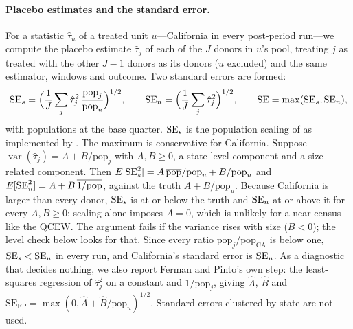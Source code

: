 \paragraph{Placebo estimates and the standard error.} For a statistic $\hat\tau_u$ of a treated
unit $u$---California in every post-period run---we compute the placebo estimate $\hat\tau_j$ of
each of the $J$ donors in $u$'s pool, treating $j$ as treated with the other $J-1$ donors as its
donors ($u$ excluded) and the same estimator, windows and outcome. Two standard errors are formed:
\begin{equation}
\mathrm{SE}_{s} = \Bigl(\frac{1}{J}\sum_j \hat\tau_j^2\,\frac{\mathrm{pop}_j}{\mathrm{pop}_u}\Bigr)^{1/2},
\qquad
\mathrm{SE}_{n} = \Bigl(\frac{1}{J}\sum_j \hat\tau_j^2\Bigr)^{1/2},
\qquad
\mathrm{SE} = \max(\mathrm{SE}_{s}, \mathrm{SE}_{n}),
\end{equation}
with populations at the base quarter. $\mathrm{SE}_{s}$ is the population scaling of
\citet{ferman2019inference} as implemented by \citet{dube2026labor}. The maximum is conservative for
California. Suppose $\operatorname{var}(\hat\tau_j) = A + B/\mathrm{pop}_j$ with $A, B \geq 0$, a
state-level component and a size-related component. Then
$E[\mathrm{SE}_{s}^2] = A\,\overline{\mathrm{pop}}/\mathrm{pop}_u + B/\mathrm{pop}_u$ and
$E[\mathrm{SE}_{n}^2] = A + B\,\overline{1/\mathrm{pop}}$, against the truth $A + B/\mathrm{pop}_u$. Because
California is larger than every donor, $\mathrm{SE}_{s}$ is at or below the truth and $\mathrm{SE}_{n}$ at or above it for
every $A, B \geq 0$; scaling alone imposes $A = 0$, which is unlikely for a near-census like the QCEW.
The argument fails if the variance rises with size ($B < 0$); the level check below looks for that.
Since every ratio $\mathrm{pop}_j/\mathrm{pop}_{\mathrm{CA}}$ is below one, $\mathrm{SE}_{s} < \mathrm{SE}_{n}$ in every run,
and California's standard error is $\mathrm{SE}_{n}$. As a diagnostic that decides nothing, we also report
Ferman and Pinto's own step: the least-squares regression of $\hat\tau_j^2$ on a constant and
$1/\mathrm{pop}_j$, giving $\hat A$, $\hat B$ and
$\mathrm{SE}_{\mathrm{FP}} = \max(0, \hat A + \hat B/\mathrm{pop}_u)^{1/2}$. Standard errors clustered
by state are not used.

